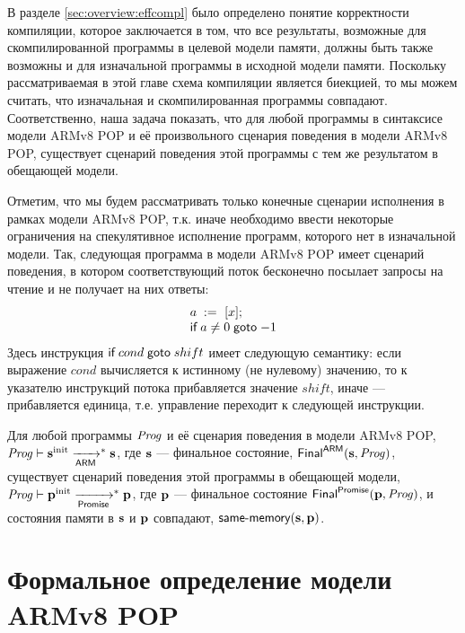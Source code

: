 В разделе \ref{sec:overview:effcompl} было определено понятие корректности компиляции,
которое заключается в том, что все результаты,
возможные для скомпилированной программы в целевой модели памяти,
должны быть также возможны и для изначальной программы в исходной модели памяти.
Поскольку рассматриваемая в этой главе схема компиляции является биекцией,
то мы можем считать, что изначальная и скомпилированная программы совпадают.
Соответственно, наша задача показать, что для любой программы в синтаксисе модели
ARMv8 POP и её произвольного сценария поведения в модели ARMv8 POP, существует
сценарий поведения этой программы с тем же результатом в обещающей модели.

Отметим, что мы будем рассматривать только конечные сценарии исполнения
в рамках модели ARMv8 POP, т.к. иначе необходимо ввести некоторые
ограничения на спекулятивное исполнение программ, которого нет в изначальной
модели.
Так, следующая программа в модели ARMv8 POP имеет сценарий поведения,
в котором соответствующий поток бесконечно посылает запросы на чтение и
не получает на них ответы:
\[\begin{array}{l}
a \;:=_{}\;[x]; \\
\textsf{if} \; a \not = 0 \; \textsf{goto} \; {-1}
\end{array}\]
Здесь инструкция $\textsf{if} \; cond \; \textsf{goto} \; shift$ имеет следующую семантику:
если выражение $cond$ вычисляется к истинному (не нулевому) значению,
то к указателю инструкций потока прибавляется значение $shift$,
иначе --- прибавляется единица, т.е. управление переходит к следующей инструкции.

\begin{theorem}
  Для любой программы $\mathit{Prog}$ и её сценария поведения в модели ARMv8 POP,
  $\mathit{Prog} \vdash \mathbf{s}^{\rm init} \xrightarrow[\mathsf{ARM}]{}^{*} \mathbf{s}$,
  где $\mathbf{s}$ --- финальное состояние, $\mathsf{Final}^{\mathsf{ARM}}(\mathbf{s}, \mathit{Prog})$,
  существует сценарий поведения этой программы в обещающей модели,
  $\mathit{Prog} \vdash \mathbf{p}^{\rm init} \xrightarrow[\mathsf{Promise}]{}^{*} \mathbf{p}$,
  где $\mathbf{p}$ --- финальное состояние $\mathsf{Final}^{\mathsf{Promise}}(\mathbf{p}, \mathit{Prog})$,
  и состояния памяти в $\mathbf{s}$ и $\mathbf{p}$ совпадают, $\textup{\sf same-memory}(\mathbf{s}, \mathbf{p})$.
\end{theorem}

\section{Формальное определение модели ARMv8 POP}
\label{sec:armpop:armmodel}

